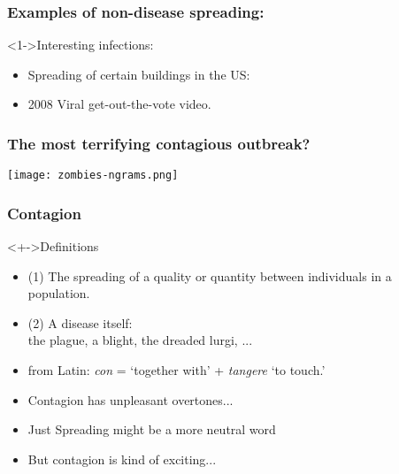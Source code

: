 \begin{frame}
  \frametitle{Examples of non-disease spreading:}

  \begin{block}<1->{Interesting infections:}
  \begin{itemize}
  \item<1->
    Spreading of certain buildings in the US:
  \item<2->
    {2008 Viral get-out-the-vote video.}
  \end{itemize}
  \end{block}
\end{frame}




\begin{frame}
  \frametitle{The most terrifying contagious outbreak?}

  \texttt{[image: zombies-ngrams.png]}
\end{frame}


\begin{frame}
  \frametitle{Contagion}
  
  \begin{block}<+->{Definitions}
    \begin{itemize}
    \item<+->
      (1) The spreading of a quality or quantity
      between individuals in a population.
    \item<+->
      (2) A disease itself:\\ the plague, a blight, the dreaded lurgi, ...
    \item<+->
      from Latin: \alert{\textit{con}} = `together with'  + \alert{\textit{tangere}} `to touch.'
    \item<+-> 
      Contagion has unpleasant overtones... 
    \item<+-> 
      Just \alert{Spreading} might be a more neutral word
    \item<+-> 
      But contagion is kind of exciting...
    \end{itemize}
  \end{block}

\end{frame}


